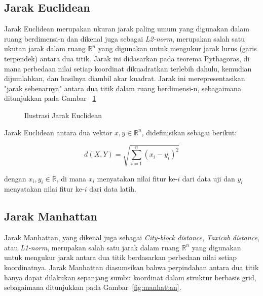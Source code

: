 \documentclass[a4paper,12pt]{report}
\numberwithin{equation}{chapter}
\begin{document}
\subsection{Jarak Euclidean}
\label{subsec:euclidean}
Jarak Euclidean merupakan ukuran jarak paling umum yang digunakan dalam ruang berdimensi-n dan dikenal juga sebagai \textit{L2-norm}, merupakan salah satu ukutan jarak dalam ruang $\mathbb{R}^n$ yang digunakan untuk mengukur jarak lurus  (garis terpendek) antara dua titik. Jarak ini didasarkan pada teorema Pythagoras, di mana perbedaan nilai setiap koordinat dikuadratkan terlebih dahulu, kemudian dijumlahkan, dan hasilnya diambil akar kuadrat. Jarak ini merepresentasikan "jarak sebenarnya" antara dua titik dalam ruang berdimensi-n, sebagaimana ditunjukkan pada Gambar ~\ref{fig:euclidean}

\begin{figure}[h]
\centering
{}
\caption{Ilustrasi Jarak Euclidean}
\label{fig:euclidean}
\end{figure}

Jarak Euclidean antara dua vektor $x, y \in \mathbb{R}^n$, didefinisikan sebagai berikut:

\begin{equation}
    d(X, Y) = \sqrt{\sum_{i=1}^{n} (x_i - y_i)^2}
    \label{eq:euclidean}
\end{equation}

dengan $x_i, y_i \in \mathbb{R}$, di mana $x_i$ menyatakan nilai fitur ke-$i$ dari data uji dan $y_i$ menyatakan nilai fitur ke-$i$ dari data latih.

\subsection{Jarak Manhattan}
\label{subsec:manhattan}
Jarak Manhattan, yang dikenal juga sebagai \textit{City-block distance}, \textit{Taxicab distance}, atau \textit{L1-norm}, merupakan salah satu jarak dalam ruang $\mathbb{R}^n$ yang digunakan untuk mengukur jarak antara dua titik berdasarkan perbedaan nilai setiap koordinatnya. Jarak Manhattan diasumsikan bahwa perpindahan antara dua titik hanya dapat dilakukan sepanjang sumbu koordinat dalam struktur berbasis grid, sebagaimana ditunjukkan pada Gambar~\ref{fig:manhattan}.
\end{document}
